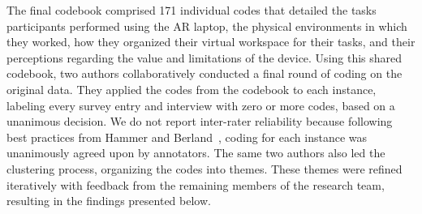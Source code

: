 The final codebook comprised 171 individual codes that detailed the tasks participants performed using the AR laptop, 
the physical environments in which they worked,
how they organized their virtual workspace for their tasks,  
and their perceptions regarding the value and limitations of the device.
Using this shared codebook, 
two authors collaboratively conducted a final round of coding on the original data. 
They applied the codes from the codebook to each instance, labeling every survey entry and interview with zero or more codes, based on a unanimous decision.
We do not report inter-rater reliability because following best practices from Hammer and
Berland~\cite{hammer2014irrcritique}, coding for each instance was unanimously agreed upon by annotators.
The same two authors also led the clustering process, organizing the codes into themes. 
These themes were refined iteratively with feedback from the remaining members of the research team, resulting in the findings presented below.




